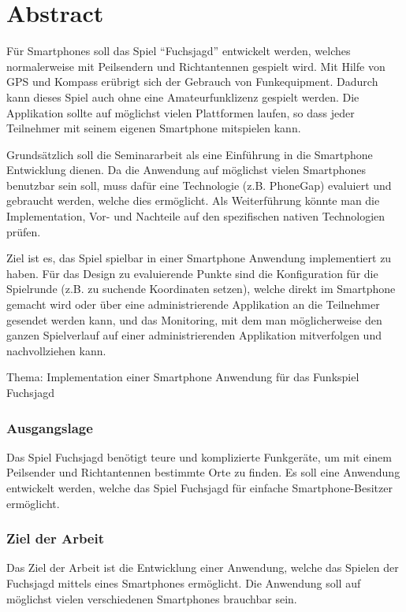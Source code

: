 
\newpage
\section{Abstract} %
\label{sec:Abstract}
Für Smartphones soll das Spiel "`Fuchsjagd"' entwickelt werden, welches normalerweise mit Peilsendern und Richtantennen gespielt wird. Mit Hilfe von GPS und Kompass erübrigt sich der Gebrauch von Funkequipment.
Dadurch kann dieses Spiel auch ohne eine Amateurfunklizenz gespielt werden. Die Applikation sollte auf möglichst vielen Plattformen laufen, so dass jeder Teilnehmer mit seinem eigenen Smartphone mitspielen kann.

Grundsätzlich soll die Seminararbeit als eine Einführung in die Smartphone Entwicklung dienen. Da die Anwendung auf möglichst vielen Smartphones benutzbar sein soll, muss dafür eine Technologie (z.B. PhoneGap) evaluiert und gebraucht werden, welche dies ermöglicht. Als Weiterführung könnte man die Implementation, Vor- und Nachteile auf den spezifischen nativen Technologien prüfen.  

Ziel ist es, das Spiel spielbar in einer Smartphone Anwendung implementiert zu haben. Für das Design zu evaluierende Punkte sind die Konfiguration für die Spielrunde (z.B. zu suchende Koordinaten setzen), welche direkt im Smartphone gemacht wird oder über eine administrierende Applikation an die Teilnehmer gesendet werden kann, und das Monitoring, mit dem man möglicherweise den ganzen Spielverlauf auf einer administrierenden Applikation mitverfolgen und nachvollziehen kann.

Thema: Implementation einer Smartphone Anwendung für das Funkspiel Fuchsjagd

\subsubsection{Ausgangslage} %
\label{ssub:Ausgangslage}
Das Spiel Fuchsjagd benötigt teure und komplizierte Funkgeräte, um mit einem Peilsender und Richtantennen bestimmte Orte zu finden. Es soll eine Anwendung entwickelt werden, welche das Spiel Fuchsjagd für einfache Smartphone-Besitzer ermöglicht.

\subsubsection{Ziel der Arbeit} %
\label{ssub:Ziel der Arbeit}
Das Ziel der Arbeit ist die Entwicklung einer Anwendung, welche das Spielen der Fuchsjagd mittels eines Smartphones ermöglicht. Die Anwendung soll auf möglichst vielen verschiedenen Smartphones brauchbar sein.

